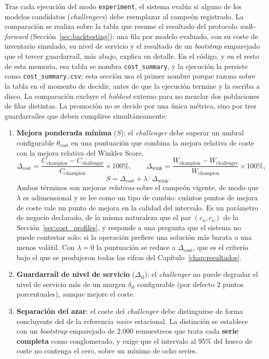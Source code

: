 Tras cada ejecución del modo \texttt{experiment}, el sistema evalúa si alguno de los modelos candidatos (\textit{challengers}) debe reemplazar al campeón registrado. La comparación se realiza sobre la tabla que resume el resultado del protocolo \textit{walk-forward} (Sección~\ref{sec:backtesting}): una fila por modelo evaluado, con su coste de inventario simulado, su nivel de servicio y el resultado de un \textit{bootstrap} emparejado que el tercer guardarraíl, más abajo, explica en detalle. En el código, y en el resto de esta memoria, esa tabla se nombra \texttt{cost\_}\allowbreak\texttt{summary}, y la ejecución la persiste como \texttt{cost\_}\allowbreak\texttt{summary.csv}; esta sección usa el primer nombre porque razona sobre la tabla en el momento de decidir, antes de que la ejecución termine y la escriba a disco. La comparación excluye el \textit{holdout} externo para no mezclar dos poblaciones de filas distintas. La promoción no se decide por una única métrica, sino por tres guardarraíles que deben cumplirse simultáneamente:

\begin{enumerate}
    \item \textbf{Mejora ponderada mínima} ($S$): el \textit{challenger} debe superar un umbral configurable $\theta_{\text{cost}}$ en una puntuación que combina la mejora relativa de coste con la mejora relativa del Winkler Score,
    \[
        \Delta_{\text{cost}} = \frac{C_{\text{champion}} - C_{\text{challenger}}}{C_{\text{champion}}} \times 100\%,
        \qquad
        \Delta_{\text{wink}} = \frac{W_{\text{champion}} - W_{\text{challenger}}}{W_{\text{champion}}} \times 100\%,
    \]
    \[S = \Delta_{\text{cost}} + \lambda \cdot \Delta_{\text{wink}}.\]
    Ambos términos son mejoras \emph{relativas} sobre el campeón vigente, de modo que $\lambda$ es adimensional y se lee como un tipo de cambio: cuántos puntos de mejora de coste vale un punto de mejora en la calidad del intervalo. Es un parámetro de negocio declarado, de la misma naturaleza que el par $(c_u, c_o)$ de la Sección~\ref{sec:cost_profiles}, y responde a una pregunta que el sistema no puede contestar solo: si la operación prefiere una solución más barata o una menos volátil. Con $\lambda = 0$ la puntuación se reduce a $\Delta_{\text{cost}}$, que es el criterio bajo el que se produjeron todas las cifras del Capítulo~\ref{chap:resultados}.
    \item \textbf{Guardarraíl de nivel de servicio} ($\Delta_{\text{sl}}$): el \textit{challenger} no puede degradar el nivel de servicio más de un margen $\delta_{\text{sl}}$ configurable (por defecto $2$ puntos porcentuales), aunque mejore el coste.
    \item \textbf{Separación del azar}: el coste del \textit{challenger} debe distinguirse de forma concluyente del de la referencia \textit{naive} estacional. La distinción se establece con un \textit{bootstrap} emparejado de $2.000$ remuestreos que trata cada \textbf{serie completa} como conglomerado, y exige que el intervalo al 95\% del hueco de coste no contenga el cero, sobre un mínimo de ocho series.
\end{enumerate}

